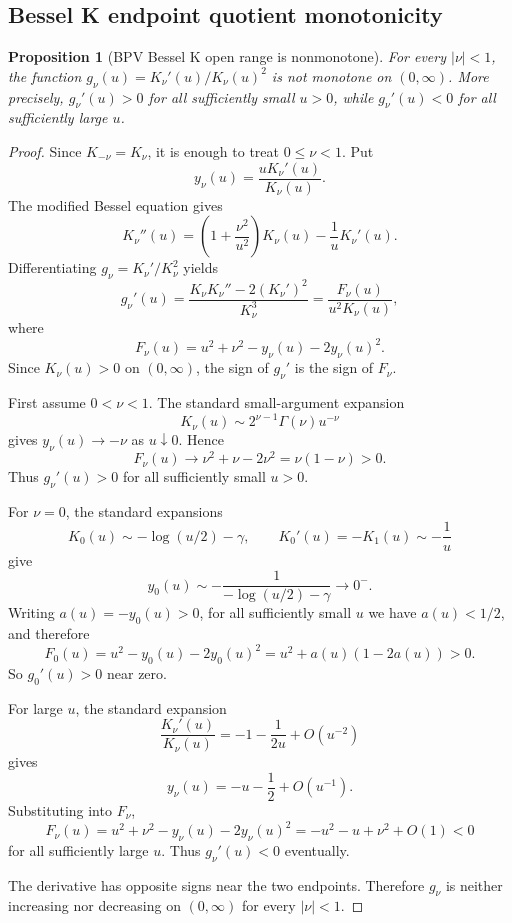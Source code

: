 \documentclass[11pt]{article}
\numberwithin{equation}{section}
\newtheorem{proposition}[theorem]{Proposition}
\theoremstyle{definition}
\theoremstyle{remark}
\newcommand{\1}{\mathbf 1}
\begin{document}
\subsection{Bessel K endpoint quotient monotonicity}
\begin{proposition}[BPV Bessel K open range is nonmonotone]
\label{res:bpv-besselk-open-range-nonmonotone}
For every \(|\nu|<1\), the function \(g_\nu(u)=K_\nu'(u)/K_\nu(u)^2\) is not monotone on \((0,\infty)\). More precisely, \(g_\nu'(u)>0\) for all sufficiently small \(u>0\), while \(g_\nu'(u)<0\) for all sufficiently large \(u\).
\end{proposition}

\begin{proof}
Since \(K_{-\nu}=K_\nu\), it is enough to treat \(0\le\nu<1\). Put
\[
y_\nu(u)=\frac{uK_\nu'(u)}{K_\nu(u)}.
\]
The modified Bessel equation gives
\[
K_\nu''(u)=\left(1+\frac{\nu^2}{u^2}\right)K_\nu(u)-\frac1uK_\nu'(u).
\]
Differentiating \(g_\nu=K_\nu'/K_\nu^2\) yields
\[
g_\nu'(u)=\frac{K_\nu K_\nu''-2(K_\nu')^2}{K_\nu^3}
=\frac{F_\nu(u)}{u^2K_\nu(u)},
\]
where
\[
F_\nu(u)=u^2+\nu^2-y_\nu(u)-2y_\nu(u)^2.
\]
Since \(K_\nu(u)>0\) on \((0,\infty)\), the sign of \(g_\nu'\) is the sign of \(F_\nu\).

First assume \(0<\nu<1\). The standard small-argument expansion
\[
K_\nu(u)\sim 2^{\nu-1}\Gamma(\nu)u^{-\nu}
\]
gives \(y_\nu(u)\to-\nu\) as \(u\downarrow0\). Hence
\[
F_\nu(u)\to \nu^2+\nu-2\nu^2=\nu(1-\nu)>0.
\]
Thus \(g_\nu'(u)>0\) for all sufficiently small \(u>0\).

For \(\nu=0\), the standard expansions
\[
K_0(u)\sim-\log(u/2)-\gamma,\qquad K_0'(u)=-K_1(u)\sim-\frac1u
\]
give
\[
y_0(u)\sim-\frac{1}{-\log(u/2)-\gamma}\to0^-.
\]
Writing \(a(u)=-y_0(u)>0\), for all sufficiently small \(u\) we have \(a(u)<1/2\), and therefore
\[
F_0(u)=u^2-y_0(u)-2y_0(u)^2
=u^2+a(u)(1-2a(u))>0.
\]
So \(g_0'(u)>0\) near zero.

For large \(u\), the standard expansion
\[
\frac{K_\nu'(u)}{K_\nu(u)}
=-1-\frac{1}{2u}+O(u^{-2})
\]
gives
\[
y_\nu(u)=-u-\frac12+O(u^{-1}).
\]
Substituting into \(F_\nu\),
\[
F_\nu(u)
=u^2+\nu^2-y_\nu(u)-2y_\nu(u)^2
=-u^2-u+\nu^2+O(1)<0
\]
for all sufficiently large \(u\). Thus \(g_\nu'(u)<0\) eventually.

The derivative has opposite signs near the two endpoints. Therefore \(g_\nu\) is neither increasing nor decreasing on \((0,\infty)\) for every \(|\nu|<1\).
\end{proof}
\end{document}
